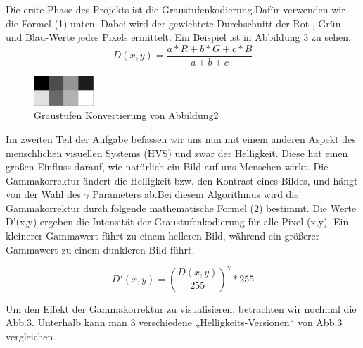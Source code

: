\documentclass[course=erap]{aspdoc}
\begin{document}
\par
Die erste Phase des Projekts ist die Graustufenkodierung.Dafür verwenden wir die Formel (1) unten. Dabei wird der gewichtete Durchschnitt der Rot-, Grün- und Blau-Werte jedes Pixels ermittelt. Ein Beispiel ist in Abbildung 3 zu sehen. 
\begin{equation}
D(x,y)=\frac{a*R+b*G+c*B}{a+b+c}
\end{equation}


\begin{figure}[h]
\centering
\includegraphics[width=0.2\textwidth]{Bilder/gamma1.pgm.png}
\caption{Graustufen Konvertierung von Abbildung2}
\end{figure}

\par
Im zweiten Teil der Aufgabe befassen wir uns nun mit einem anderen Aspekt des menschlichen visuellen Systems (HVS) und zwar der Helligkeit. Diese hat einen großen Einfluss darauf, wie natürlich ein Bild auf uns Menschen wirkt. Die Gammakorrektur ändert die Helligkeit bzw. den Kontrast eines Bildes, und hängt von der Wahl des $ \gamma $ Parameters ab.Bei diesem Algorithmus wird die Gammakorrektur durch folgende mathematische Formel (2) bestimmt. Die Werte D'(x,y) ergeben die Intensität der Graustufenkodierung für alle Pixel (x,y). Ein kleinerer Gammawert führt zu einem helleren Bild, während ein größerer Gammawert zu einem dunkleren Bild führt.

\begin{equation}
D'(x,y)={\left( \frac{D(x,y)}{255} \right)}^{\gamma}*255
\end{equation}

\par
Um den Effekt der Gammakorrektur zu visualisieren, betrachten wir nochmal die Abb.3. Unterhalb kann man 3 verschiedene „Helligkeits-Versionen“ von Abb.3 vergleichen.
\end{document}
